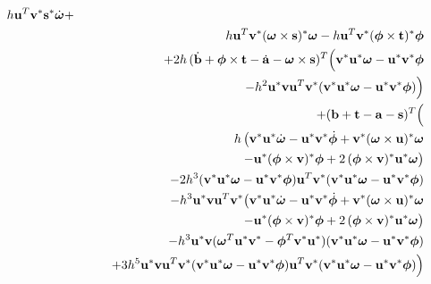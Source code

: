 \begin{eqnarray}
        h\ve{u}^T\dual{\ve{v}}\dual{\ve{s}}\dot{\ve{\omega}} + \nonumber\\*&&
        h\ve{u}^T\dual{\ve{v}}\dual{(\ve{\omega}\times\ve{s})}\ve{\omega} -
        h\ve{u}^T\dual{\ve{v}}\dual{(\ve{\phi}\times\ve{t})}\ve{\phi} \nonumber\\*&&
        +2h\,(\dot{\ve{b}} + \ve{\phi}\times\ve{t} - \dot{\ve{a}} - \ve{\omega}\times\ve{s})^T
        \Big(\dual{\ve{v}}\dual{\ve{u}}\ve{\omega} - \dual{\ve{u}}\dual{\ve{v}}\ve{\phi}
        \nonumber\\*&&\quad\quad -h^2\dual{\ve{u}}\ve{v}\ve{u}^T\dual{\ve{v}}
        (\dual{\ve{v}}\dual{\ve{u}}\ve{\omega} - \dual{\ve{u}}\dual{\ve{v}}\ve{\phi})\Big)
        \nonumber\\*&& +(\ve{b} + \ve{t} - \ve{a} - \ve{s})^T \Big(
        \nonumber\\*&&\quad\quad h\,\big(
        \dual{\ve{v}}\dual{\ve{u}}\dot{\ve{\omega}} - \dual{\ve{u}}\dual{\ve{v}}\dot{\ve{\phi}} +
        \dual{\ve{v}}\dual{(\ve{\omega}\times\ve{u})}\ve{\omega} \nonumber\\*&&\quad\quad\quad\quad
        -\dual{\ve{u}}\dual{(\ve{\phi}\times\ve{v})}\ve{\phi} +
        2\,\dual{(\ve{\phi}\times\ve{v})}\dual{\ve{u}}\ve{\omega} \big)
        \nonumber\\*&&\quad\quad
        -2h^3 (\dual{\ve{v}}\dual{\ve{u}}\ve{\omega} - \dual{\ve{u}}\dual{\ve{v}}\ve{\phi})
        \ve{u}^T\dual{\ve{v}}
        (\dual{\ve{v}}\dual{\ve{u}}\ve{\omega} - \dual{\ve{u}}\dual{\ve{v}}\ve{\phi})
        \nonumber\\*&&\quad\quad
        -h^3\dual{\ve{u}}\ve{v}\ve{u}^T\dual{\ve{v}} \big(
        \dual{\ve{v}}\dual{\ve{u}}\dot{\ve{\omega}} - \dual{\ve{u}}\dual{\ve{v}}\dot{\ve{\phi}} +
        \dual{\ve{v}}\dual{(\ve{\omega}\times\ve{u})}\ve{\omega} \nonumber\\*&&\quad\quad\quad\quad
        -\dual{\ve{u}}\dual{(\ve{\phi}\times\ve{v})}\ve{\phi} +
        2\,\dual{(\ve{\phi}\times\ve{v})}\dual{\ve{u}}\ve{\omega} \big)
        \nonumber\\*&&\quad\quad
        -h^3 \dual{\ve{u}}\ve{v}
        (\ve{\omega}^T\dual{\ve{u}}\dual{\ve{v}} - \ve{\phi}^T\dual{\ve{v}}\dual{\ve{u}})
        (\dual{\ve{v}}\dual{\ve{u}}\ve{\omega} - \dual{\ve{u}}\dual{\ve{v}}\ve{\phi})
        \nonumber\\*&&\quad\quad
        +3h^5 \dual{\ve{u}}\ve{v} \ve{u}^T\dual{\ve{v}}
        (\dual{\ve{v}}\dual{\ve{u}}\ve{\omega} - \dual{\ve{u}}\dual{\ve{v}}\ve{\phi})
        \ve{u}^T\dual{\ve{v}}
        (\dual{\ve{v}}\dual{\ve{u}}\ve{\omega} - \dual{\ve{u}}\dual{\ve{v}}\ve{\phi}) \Big) \nonumber
\end{eqnarray}
\newpage

